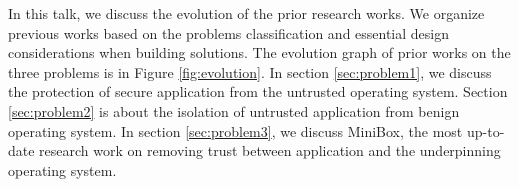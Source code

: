 In this talk, we discuss the evolution of the prior research works. We organize
previous works based on the problems classification and essential design
considerations when building solutions. The evolution graph of prior works on
the three problems is in Figure \ref{fig:evolution}. In section
\ref{sec:problem1}, we discuss the protection of secure application from the
untrusted operating system. Section \ref{sec:problem2} is about the isolation of
untrusted application from benign operating system. In section
\ref{sec:problem3}, we discuss MiniBox, the most up-to-date research work on
removing trust between application and the underpinning operating system.

